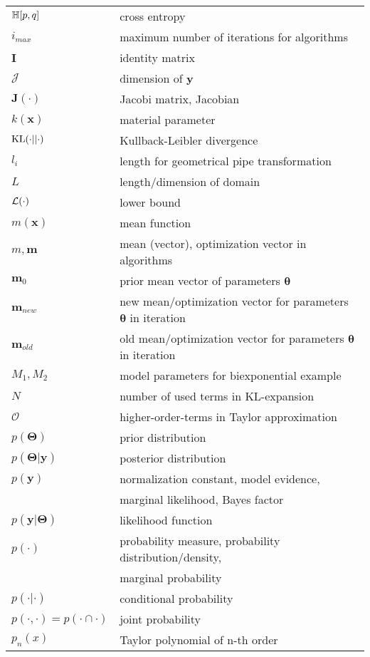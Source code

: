 \begin{longtable}{p{4cm} l}
  $\mathbb{H}[p,q]$ & cross entropy \\
  $i_{max}$ & maximum number of iterations for algorithms \\
  $\bm{I}$ & identity matrix \\
  $\mathcal{J}$ & dimension of $\bm{y}$ \\
  $\bm{J}(\cdot)$ & Jacobi matrix, Jacobian \\
  $k(\bm{x})$ & material parameter \\
  $\text{KL}(\cdot||\cdot)$ & Kullback-Leibler divergence \\
  $l_i$ & length for geometrical pipe transformation \\
  $L$ & length/dimension of domain \\
  $\mathcal{L}(\cdot)$ & lower bound \\
  $m(\bm{x})$ & mean function \\
  $m, \bm{m}$ & mean (vector), optimization vector in algorithms \\
  $\bm{m}_0$ & prior mean vector of parameters $\bm{\theta}$\\
  $\bm{m}_{new}$ & new mean/optimization vector for parameters $\bm{\theta}$ in iteration \\
  $\bm{m}_{old}$ & old mean/optimization vector for parameters $\bm{\theta}$ in iteration \\
  $M_1, M_2$ & model parameters for biexponential example \\
  $N$ & number of used terms in KL-expansion \\
  $\mathcal{O}$ & higher-order-terms in Taylor approximation \\
  $p(\bm{\Theta})$ & prior distribution \\
  $p(\bm{\Theta}|\bm{y})$ & posterior distribution \\
  $p(\bm{y})$ & normalization constant, model evidence, \\
                     & marginal likelihood, Bayes factor \\
  $p(\bm{y}|\bm{\Theta})$ & likelihood function \\
  $p(\cdot)$ & probability measure, probability distribution/density,\\
             & marginal probability \\
  $p(\cdot|\cdot)$ & conditional probability \\
  $p(\cdot,\cdot) = p(\cdot \cap \cdot)$ & joint probability \\
  $p_n(x)$ & Taylor polynomial of n-th order \\

\end{longtable}
